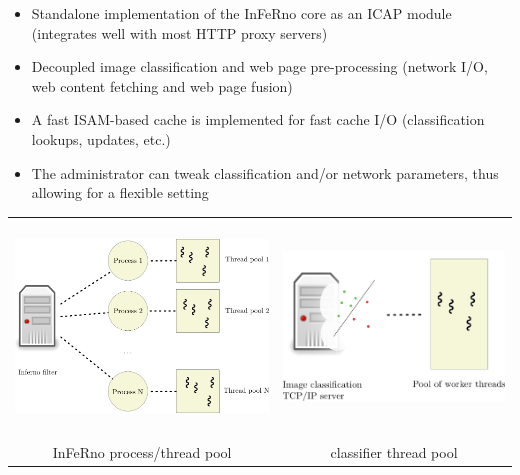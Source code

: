 \documentclass[portrait,a0paper,final,margin=6em]{baposter}
\begin{document}
\begin{poster}
{	\begin{itemize}
		\item Standalone implementation of the InFeRno core as an ICAP module (integrates well with most HTTP proxy servers)
		\item Decoupled image classification and web page pre-processing (network I/O, web content fetching and web page fusion)
		\item A fast ISAM-based cache is implemented for fast cache I/O (classification lookups, updates, etc.)
        \item The administrator can tweak classification and/or network parameters, thus allowing for a flexible setting
	\end{itemize}
	\begin{center}
		\begin{tabular}[c]{cc}
		\ \ \includegraphics[width=.40\columnwidth]{inferno_tp}  \ \ &
		\ \ \includegraphics[width=.40\columnwidth]{ic_tp} \ \ \\
			InFeRno process/thread pool & classifier thread pool\\
		\end{tabular}
	\end{center}
	\vspace{0.3 em}
   }


\end{poster}
\end{document}
